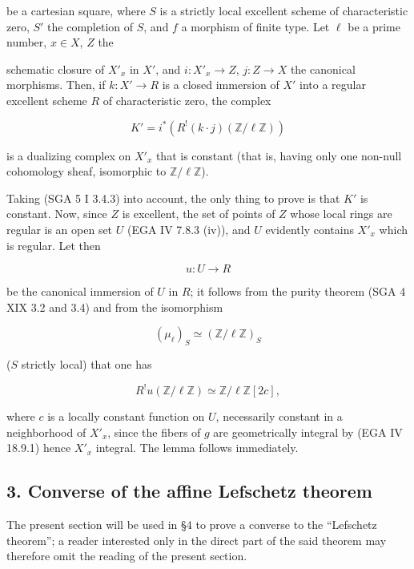 \documentclass[
]{article}
\begin{document}
be a cartesian square, where \(S\) is a strictly local excellent scheme
of characteristic zero, \(S'\) the completion of \(S\), and \(f\) a
morphism of finite type. Let \(\ell\) be a prime number, \(x \in X\),
\(Z\) the

schematic closure of \(X'_{x}\) in \(X'\), and \(i : X'_{x} \to Z\),
\(j : Z \to X\) the canonical morphisms. Then, if \(k : X' \to R\) is a
closed immersion of \(X'\) into a regular excellent scheme \(R\) of
characteristic zero, the complex

\[
K' = i^{*}(R^{!}(k \cdot j)(\mathbb{Z}/\ell \mathbb{Z}))
\]

is a dualizing complex on \(X'_{x}\) that is constant (that is, having
only one non-null cohomology sheaf, isomorphic to
\(\mathbb{Z}/\ell \mathbb{Z}\)).

Taking (SGA 5 I 3.4.3) into account, the only thing to prove is that
\(K'\) is constant. Now, since \(Z\) is excellent, the set of points of
\(Z\) whose local rings are regular is an open set \(U\) (EGA IV 7.8.3
(iv)), and \(U\) evidently contains \(X'_{x}\) which is regular. Let
then

\[
u : U \to R
\]

be the canonical immersion of \(U\) in \(R\); it follows from the purity
theorem (SGA 4 XIX 3.2 and 3.4) and from the isomorphism

\[
(\mu_{\ell})_{S} \simeq (\mathbb{Z}/\ell \mathbb{Z})_{S}
\]

(\(S\) strictly local) that one has

\[
R^{!} u(\mathbb{Z}/\ell \mathbb{Z}) \simeq \mathbb{Z}/\ell \mathbb{Z}[2c],
\]

where \(c\) is a locally constant function on \(U\), necessarily
constant in a neighborhood of \(X'_{x}\), since the fibers of \(g\) are
geometrically integral by (EGA IV 18.9.1) hence \(X'_{x}\) integral. The
lemma follows immediately.

\subsection{3. Converse of the affine Lefschetz
theorem}\label{converse-of-the-affine-lefschetz-theorem}

The present section will be used in §4 to prove a converse to the
``Lefschetz theorem''; a reader interested only in the direct part of
the said theorem may therefore omit the reading of the present section.
\end{document}
